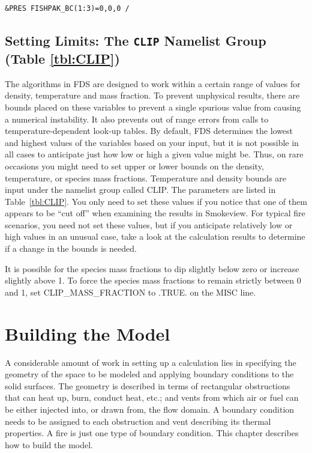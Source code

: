 \documentclass[11pt]{book}
\begin{document}
\begin{lstlisting}
&PRES FISHPAK_BC(1:3)=0,0,0 /
\end{lstlisting}



\section{Setting Limits: The \texorpdfstring{{\tt CLIP}}{CLIP} Namelist Group (Table \ref{tbl:CLIP})}
\label{info:CLIP}

The algorithms in FDS are designed to work within a certain range of values for density, temperature and mass fraction. To prevent unphysical results,
there are bounds placed on these variables to prevent a single spurious value from causing a numerical instability. It also prevents out of range
errors from calls to temperature-dependent look-up tables. By default, FDS determines the lowest and highest values of the variables based on your input, but it is not
possible in all cases to anticipate just how low or high a given value might be. Thus,
on rare occasions you might need to set upper or lower bounds on the density, temperature, or species mass fractions. Temperature and density bounds are input under the
namelist group called {\ct CLIP}. The parameters are listed in Table~\ref{tbl:CLIP}. You only need to set these values if you notice that one of them appears to be
``cut off'' when examining the results in Smokeview. For typical fire scenarios, you need not set these values, but if you anticipate relatively low or high values in an
unusual case, take a look at the calculation results to determine if a change in the bounds is needed.

It is possible for the species mass fractions to dip slightly below zero or increase slightly above 1. To force the species mass fractions to remain strictly between 0 and 1, set {\ct CLIP\_MASS\_FRACTION} to {\ct .TRUE.} on the {\ct MISC} line.








\chapter{Building the Model}

A considerable amount of work in setting up a calculation lies in specifying the
geometry of the space to be modeled and applying boundary conditions
to the solid surfaces. The geometry is described in terms
of rectangular obstructions that can heat up, burn, conduct heat, etc.;
and vents from which air or fuel can be
either injected into, or drawn from, the flow domain.
A boundary condition needs to be assigned to each obstruction
and vent describing its thermal properties. A fire is just one type of
boundary condition. This chapter describes how to build the model.
\end{document}

